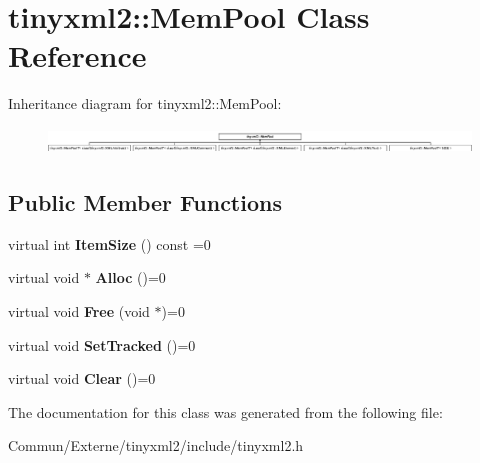 \hypertarget{classtinyxml2_1_1_mem_pool}{}\section{tinyxml2\+:\+:Mem\+Pool Class Reference}
\label{classtinyxml2_1_1_mem_pool}
Inheritance diagram for tinyxml2\+:\+:Mem\+Pool\+:\begin{figure}[H]
\begin{center}
\leavevmode
\includegraphics[height=0.691358cm]{classtinyxml2_1_1_mem_pool}
\end{center}
\end{figure}
\subsection*{Public Member Functions}
\begin{DoxyCompactItemize}
\item 
virtual int {\bfseries Item\+Size} () const  =0\hypertarget{classtinyxml2_1_1_mem_pool_afb3d8c6cbe91b44f90043d0d94dc7306}{}\label{classtinyxml2_1_1_mem_pool_afb3d8c6cbe91b44f90043d0d94dc7306}

\item 
virtual void $\ast$ {\bfseries Alloc} ()=0\hypertarget{classtinyxml2_1_1_mem_pool_a4f977b5fed752c0bbfe5295f469d6449}{}\label{classtinyxml2_1_1_mem_pool_a4f977b5fed752c0bbfe5295f469d6449}

\item 
virtual void {\bfseries Free} (void $\ast$)=0\hypertarget{classtinyxml2_1_1_mem_pool_a49e3bfac2cba2ebd6776b31e571f64f7}{}\label{classtinyxml2_1_1_mem_pool_a49e3bfac2cba2ebd6776b31e571f64f7}

\item 
virtual void {\bfseries Set\+Tracked} ()=0\hypertarget{classtinyxml2_1_1_mem_pool_ac5804dd1387b2e4de5eef710076a0db1}{}\label{classtinyxml2_1_1_mem_pool_ac5804dd1387b2e4de5eef710076a0db1}

\item 
virtual void {\bfseries Clear} ()=0\hypertarget{classtinyxml2_1_1_mem_pool_a74fcdef9756917c8ae19fbbb4d658ed7}{}\label{classtinyxml2_1_1_mem_pool_a74fcdef9756917c8ae19fbbb4d658ed7}

\end{DoxyCompactItemize}


The documentation for this class was generated from the following file\+:\begin{DoxyCompactItemize}
\item 
Commun/\+Externe/tinyxml2/include/tinyxml2.\+h\end{DoxyCompactItemize}
